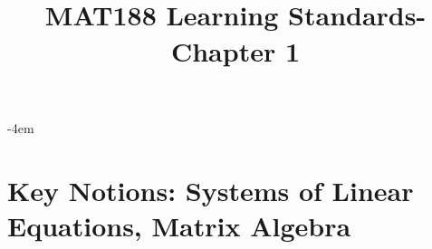 \documentclass[12pt,oneside,english]{amsart}
\numberwithin{equation}{section}
\numberwithin{figure}{section}
\newif\ifshowSoln
\begin{document}
	
\title{
	\textbf{	 \\ MAT188 Learning Standards-Chapter 1
        }  
	\ifshowSoln
	and notes for instructors
	\else
{}
	\fi
}

\kern -4em

\maketitle

\section*{\color{blue} Key Notions:  Systems of Linear Equations, Matrix Algebra
    }

\end{document}
